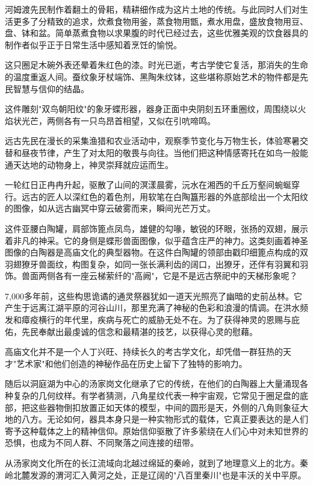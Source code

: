 河姆渡先民制作着翻土的骨耜，精耕细作成为这片土地的传统。与此同时人们对生活更多了分精致的追求，炊煮食物用釜，蒸食物用甑，煮水用盘，盛放食物用豆、盘、钵和盆。简单蒸煮食物以求果腹的时代已经过去，这些优雅美观的饮食器具的制作者似乎正于日常生活中感知着烹饪的愉悦。

这只圈足木碗外表还晕着朱红色的漆。时光已逝，考古学使它复活，那消失的生命的温度重返人间。蚕纹象牙杖端饰、黑陶朱纹钵，这些堪称原始艺术的物件都是先民智慧与信仰的结晶。

这件雕刻"双鸟朝阳纹"的象牙蝶形器，器身正面中央阴刻五环重圈纹，周围绕以火焰状光芒，两侧各有一只鸟昂首相望，又似在引吭啼鸣。

远古先民在漫长的采集渔猎和农业活动中，观察季节变化与万物生长，体验寒暑交替和昼夜节律，产生了对太阳的敬畏与向往。当他们把这种情感寄托在如鸟一般能通天达地的动物身上，神灵崇拜就应运而生。

一轮红日正冉冉升起，驱散了山间的溟漾晨雾，沅水在湘西的千丘万壑间蜿蜒穿行。远古的匠人以深红色的着色剂，用软笔在白陶簋形器的外底部绘出一个太阳纹的图像，如从远古幽冥中穿云破雾而来，瞬间光芒万丈。

这件亚腰白陶罐，肩部饰篦点凤鸟，雄健的勾喙，敏锐的环眼，张扬的双翅，展示着非凡的神采。它的身侧是蝶形兽面图像，似乎蕴含庄严的神力。这类刻画着神圣图像的白陶器是高庙文化的典型器物。在这件白陶罐的领部由戳印细篦点构成的双羽翅獠牙兽面纹，构图复杂，如同一张长满利齿的阔口，出獠牙，还伴有羽翼和羽饰。兽面两侧各有一座云梯萦纤的"高阙"，它是不是远古祭祀中的天梯形象呢？

7,000多年前，这些构思诡谲的通灵祭器犹如一道天光照亮了幽暗的史前丛林。它产生于远离江湖平原的河谷山川，那里充满了神秘的色彩和浪漫的情调。在洪水频发和瘴疫横行的年代里，疾病与死亡的威胁无处不在。为了获得神灵的恩赐与庇佑，先民奉献出最虔诚的信念和最精湛的技艺，以获得心灵的慰藉。

高庙文化并不是一个人丁兴旺、持续长久的考古学文化，却凭借一群狂热的天才"艺术家"和他们创造的神秘作品在历史上留下了独特的影响力。

随后以洞庭湖为中心的汤家岗文化继承了它的传统，在他们的白陶器上大量涌现各种复杂的几何纹样。有学者猜测，八角星纹代表一种宇宙观，它常见于圈足盘的底部，把这些器物倒扣放置正如天体的模型，中间的圆形是天，外侧的八角则象征大地的八方。无论如何，器具本身只是一种实物形式的载体，它真正要表达的是人们寄予这种载体之上的精神信仰。原始信仰驱散了许多萦绕在人们心中对未知世界的恐惧，也成为不同人群、不同聚落之间连接的纽带。

从汤家岗文化所在的长江流域向北越过绵延的秦岭，就到了地理意义上的北方。秦岭北麓发源的渭河汇入黄河之处，正是辽阔的"八百里秦川"也是丰沃的关中平原。

